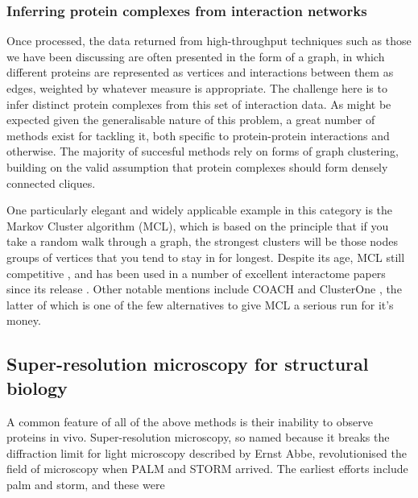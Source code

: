 \documentclass[a4paper,11pt,twoside,openright]{scrbook}
\begin{document}

\subsubsection{Inferring protein complexes from interaction networks}
Once processed, the data returned from high-throughput techniques such as those we have been discussing are often presented in the form of a graph, in which different proteins are represented as vertices and interactions between them as edges, weighted by whatever measure is appropriate. The challenge here is to infer distinct protein complexes from this set of interaction data. As might be expected given the generalisable nature of this problem, a great number of methods exist for tackling it, both specific to protein-protein interactions and otherwise. The majority of succesful methods rely on forms of graph clustering, building on the valid assumption that protein complexes should form densely connected cliques.

One particularly elegant and widely applicable example in this category is the Markov Cluster algorithm \cite{VanDongen2000} (MCL), which is based on the principle that if you take a random walk through a graph, the strongest clusters will be those nodes groups of vertices that you tend to stay in for longest. Despite its age, MCL still competitive \cite{Li2010}, and has been used in a number of excellent interactome papers since its release \cite{Krogan2006,Wan2015}. Other notable mentions include COACH and ClusterOne \cite{Wu2009,Nepusz2012}, the latter of which is one of the few alternatives to give MCL a serious run for it's money.

\subsection{Super-resolution microscopy for structural biology}
A common feature of all of the above methods is their inability to observe proteins in vivo. Super-resolution microscopy, so named because it breaks the diffraction limit for light microscopy described by Ernst Abbe, revolutionised the field of microscopy when PALM and STORM arrived. The earliest efforts include palm and storm, and these were
\end{document}
